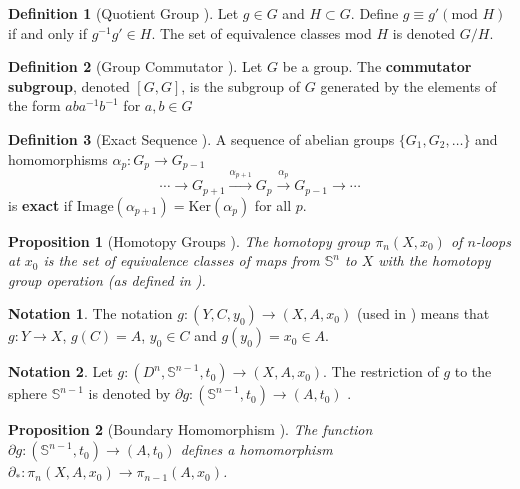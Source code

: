 \documentclass[12pt]{article}
\newtheorem{prop}{Proposition}
\theoremstyle{definition}
\newtheorem{defn}{Definition}
\newtheorem*{notation}{Notation}
\begin{document}
\begin{defn}[Quotient Group \cite{intro-top-manifolds}]
    Let \(g \in G\) and \(H \subset G\). Define \(g \equiv g' (\text{mod } H)\)
    if and only if \(g^{-1}g' \in H\). The set of equivalence classes mod \(H\)
    is denoted \(G/H\).
\end{defn}

\begin{defn}[Group Commutator \cite{intro-top-manifolds}]
    Let \(G\) be a group. The \textbf{commutator subgroup}, denoted \([G,G]\),
    is the subgroup of \(G\) generated by the elements of the form
    \(a b a^{-1} b^{-1}\) for \(a,b \in G\)
\end{defn}

\begin{defn}[Exact Sequence \cite{intro-top-manifolds}]
    A sequence of abelian groups \(\{G_1, G_2, \ldots\}\) and
    homomorphisms \(\alpha_p : G_p \rightarrow G_{p-1}\)
    \[
        \cdots \rightarrow G_{p+1} \xrightarrow{\alpha_{p+1}} G_p
    \xrightarrow{\alpha_p} G_{p-1} \rightarrow \cdots
    \]
    is \textbf{exact} if \(\text{Image}(\alpha_{p+1}) = \text{Ker}(\alpha_p)\)
    for all \(p\).
\end{defn}

\begin{prop}[Homotopy Groups \cite{topology-fiber-bundles}]
    The homotopy group \(\pi_n(X,x_0)\) of \(n\)-loops at \(x_0\) is the
    set of equivalence classes of maps from \(\mathbb{S}^n\) to \(X\) with the
    homotopy group operation (as defined in \cite{intro-top-manifolds}).
\end{prop}

\begin{notation}
    The notation \(g : (Y,C,y_0) \rightarrow (X,A,x_0)\) (used in 
    \cite{topology-fiber-bundles}) means that \(g : Y \rightarrow X\), 
    \(g(C) = A\), \(y_0 \in C\) and \(g(y_0) = x_0 \in A\).
\end{notation}

\begin{notation}
    Let \(g : (D^n, \mathbb{S}^{n-1},t_0) \rightarrow (X,A,x_0)\). 
    The restriction of \(g\) to the sphere \(\mathbb{S}^{n-1}\) is denoted by 
    \(\partial g : (\mathbb{S}^{n-1},t_0) \rightarrow (A,t_0)\)
    \cite{topology-fiber-bundles}.
\end{notation}

\begin{prop}[Boundary Homomorphism \cite{topology-fiber-bundles}]
    The function \(\partial g : (\mathbb{S}^{n-1},t_0) \rightarrow (A,t_0)\)
    defines a homomorphism 
    \(\partial_* : \pi_n(X,A,x_0) \rightarrow \pi_{n-1}(A,x_0)\).
\end{prop}
\end{document}
